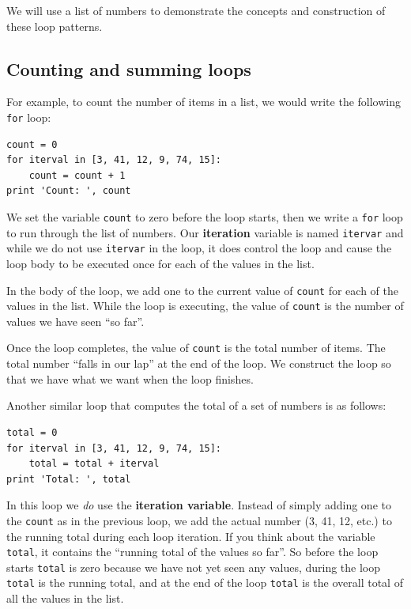 \documentclass[10pt]{book}
\begin{document}
We will use a list of numbers to demonstrate the concepts and construction
of these loop patterns.  

\subsection{Counting and summing loops}

For example, to count the number of items
in a list, we would write the following {\tt for} loop:

\beforeverb
\begin{verbatim}
count = 0
for iterval in [3, 41, 12, 9, 74, 15]:
    count = count + 1
print 'Count: ', count
\end{verbatim}
\afterverb
%
We set the variable {\tt count} to zero before the loop starts,
then we write a {\tt for} loop to run through the list of numbers.
Our {\bf iteration} variable is named {\tt itervar} and while we do
not use {\tt itervar} in the loop, it does control the loop and cause
the loop body to be executed once for each of the values in the list.

In the body of the loop, we add one to the current value of {\tt count}
for each of the values in the list.  While the loop is executing, the 
value of {\tt count} is the number of values we have seen ``so far''.

Once the loop completes, the value of {\tt count} is the total number
of items.   The total number ``falls in our lap'' at the end of the 
loop.  We construct the loop so that we have what we want when the loop
finishes.

Another similar loop that computes the total of a set of numbers
is as follows:

\beforeverb
\begin{verbatim}
total = 0
for iterval in [3, 41, 12, 9, 74, 15]:
    total = total + iterval
print 'Total: ', total
\end{verbatim}
\afterverb
%
In this loop we {\em do} use the {\bf iteration variable}.
Instead of simply adding one to the {\tt count} as in the previous loop, 
we add the actual number (3, 41, 12, etc.) to the running 
total during each loop iteration.
If you think about the variable {\tt total}, it contains the 
``running total of the values so far''.  So before the loop
starts {\tt total} is zero because we have not yet seen any values,
during the loop {\tt total} is the running total, and at the end of 
the loop {\tt total} is the overall total of all the values 
in the list.
\end{document}
